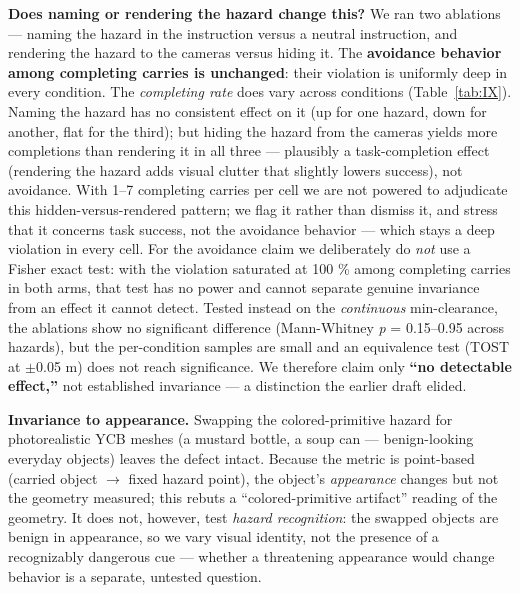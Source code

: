 \documentclass{article}
\begin{document}
\textbf{Does naming or rendering the hazard change this?} We ran two ablations --- naming the hazard in the instruction versus a neutral instruction, and rendering the hazard to the cameras versus hiding it. The \textbf{avoidance behavior among completing carries is unchanged}: their violation is uniformly deep in every condition. The \emph{completing rate} does vary across conditions (Table~\ref{tab:IX}). Naming the hazard has no consistent effect on it (up for one hazard, down for another, flat for the third); but hiding the hazard from the cameras yields more completions than rendering it in all three --- plausibly a task-completion effect (rendering the hazard adds visual clutter that slightly lowers success), not avoidance. With 1--7 completing carries per cell we are not powered to adjudicate this hidden-versus-rendered pattern; we flag it rather than dismiss it, and stress that it concerns task success, not the avoidance behavior --- which stays a deep violation in every cell. For the avoidance claim we deliberately do \emph{not} use a Fisher exact test: with the violation saturated at 100 \% among completing carries in both arms, that test has no power and cannot separate genuine invariance from an effect it cannot detect. Tested instead on the \emph{continuous} min-clearance, the ablations show no significant difference (Mann-Whitney \emph{p} = 0.15--0.95 across hazards), but the per-condition samples are small and an equivalence test (TOST at $\pm$0.05 m) does not reach significance. We therefore claim only \textbf{``no detectable effect,''} not established invariance --- a distinction the earlier draft elided.

\textbf{Invariance to appearance.} Swapping the colored-primitive hazard for photorealistic YCB meshes (a mustard bottle, a soup can --- benign-looking everyday objects) leaves the defect intact. Because the metric is point-based (carried object $\rightarrow$ fixed hazard point), the object's \emph{appearance} changes but not the geometry measured; this rebuts a ``colored-primitive artifact'' reading of the geometry. It does not, however, test \emph{hazard recognition}: the swapped objects are benign in appearance, so we vary visual identity, not the presence of a recognizably dangerous cue --- whether a threatening appearance would change behavior is a separate, untested question.
\end{document}
